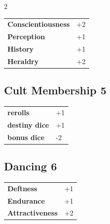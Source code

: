 \begin{multicols}{2}
\begin{tcolorbox}
\begin{tabular}{@{}ll@{}}
    \textbf{Conscientiousness} & +2\\
    \textbf{Perception} & +1\\
    \textbf{History} & +1\\
    \textbf{Heraldry} & +2\\
\end{tabular}


\end{tcolorbox}

\begin{tcolorbox}
    \subsection*{Cult Membership \hfill \small{5 }}
    \tcblower




\begin{tabular}{@{}ll@{}}
    \textbf{rerolls} & +1\\
    \textbf{destiny dice} & +1\\
    \textbf{bonus dice} & -2\\
\end{tabular}


\end{tcolorbox}

\begin{tcolorbox}
    \subsection*{Dancing \hfill \small{6 }}
    \tcblower




\begin{tabular}{@{}ll@{}}
    \textbf{Deftness} & +1\\
    \textbf{Endurance} & +1\\
    \textbf{Attractiveness} & +2\\
\end{tabular}



\end{tcolorbox}
\end{multicols}
